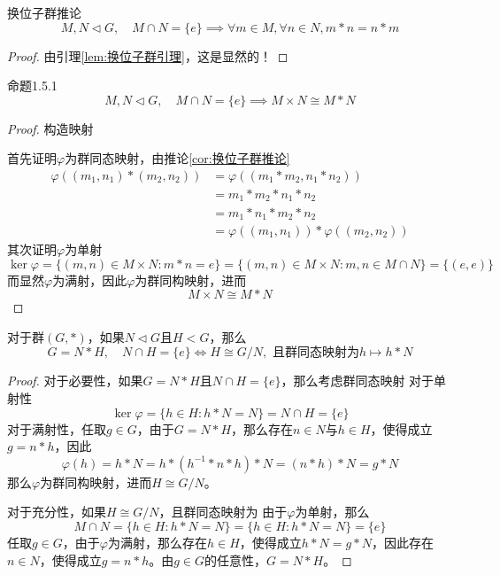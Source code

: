 \begin{corollary}{}{换位子群推论}
	$$
	M,N\lhd G, \quad M\cap N=\{e\}\implies \forall m\in M,\forall n\in N,m*n=n*m
	$$
\end{corollary}

\begin{proof}
	由引理\ref{lem:换位子群引理}，这是显然的！
\end{proof}

\begin{proposition}{}{命题1.5.1}
	$$
	M,N\lhd G, \quad M\cap N=\{e\}\implies M\times N\cong M*N
	$$
\end{proposition}

\begin{proof}
	构造映射
	
	首先证明$\varphi$为群同态映射，由推论\ref{cor:换位子群推论}
	\begin{align*}
		\varphi((m_1,n_1)*(m_2,n_2))
		& = \varphi((m_1*m_2,n_1*n_2))\\
		& = m_1*m_2*n_1*n_2\\
		& = m_1*n_1*m_2*n_2\\
		& = \varphi((m_1,n_1))*\varphi((m_2,n_2))
	\end{align*}
	其次证明$\varphi$为单射
	$$
	\ker\varphi=\{ (m,n)\in M\times N:m*n=e \}=\{ (m,n)\in M\times N:m,n\in M\cap N \}=\{(e,e)\}
	$$
	而显然$\varphi$为满射，因此$\varphi$为群同构映射，进而
	$$
	M\times N\cong M*N
	$$
\end{proof}

\begin{proposition}
	对于群$(G,*)$，如果$N\lhd G$且$H<G$，那么
	$$
	G=N*H,\quad N\cap H=\{e\}\iff H\cong G/N,\text{ 且群同态映射为}h\mapsto h*N
	$$
\end{proposition}

\begin{proof}
	对于必要性，如果$G=N*H$且$N\cap H=\{e\}$，那么考虑群同态映射
	对于单射性
	$$
	\ker\varphi=\{ h\in H:h*N=N \}=N\cap H=\{e\}
	$$
	对于满射性，任取$g\in G$，由于$G=N*H$，那么存在$n\in N$与$h\in H$，使得成立$g=n*h$，因此
	$$
	\varphi(h)=h*N=h*(h^{-1}*n*h)*N=(n*h)*N=g*N
	$$
	那么$\varphi$为群同构映射，进而$H\cong G/N$。
	
	对于充分性，如果$ H\cong G/N$，且群同态映射为
	由于$\varphi$为单射，那么
	$$
	M\cap N=\{ h\in H:h*N=N \}=\{ h\in H:h*N=N \}=\{e\}
	$$
	任取$g\in G$，由于$\varphi$为满射，那么存在$h\in H$，使得成立$h*N=g*N$，因此存在$n\in N$，使得成立$g=n*h$。由$g\in G$的任意性，$G=N*H$。
\end{proof}

